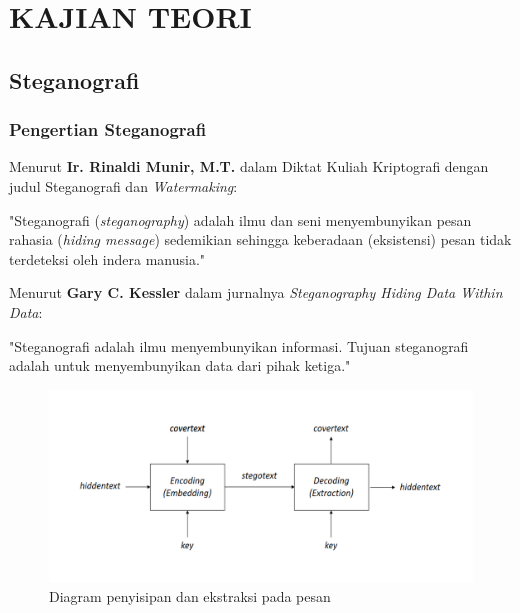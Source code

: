 
\chapter{KAJIAN TEORI}                

\section{Steganografi}
	\subsection{Pengertian Steganografi}
	Menurut \textbf{Ir. Rinaldi Munir, M.T.} dalam Diktat Kuliah Kriptografi dengan judul Steganografi dan \emph{Watermaking}:
	
	"Steganografi (\emph{steganography}) adalah ilmu dan seni menyembunyikan pesan rahasia (\emph{hiding message}) sedemikian sehingga keberadaan (eksistensi) pesan tidak terdeteksi oleh indera manusia." \cite{munir}
	
	Menurut \textbf{Gary C. Kessler} dalam jurnalnya \emph{Steganography Hiding Data Within Data}:
	
	"Steganografi adalah ilmu menyembunyikan informasi. Tujuan steganografi adalah untuk menyembunyikan data dari pihak ketiga." \cite{kessler}
	
	\begin{figure}[H]
		\centering
		\includegraphics[width=1\textwidth]{gambar/diagram_steganografi}
		\caption{Diagram penyisipan dan ekstraksi pada pesan}
		\label{diagram_steganografi}
	\end{figure} 
	
